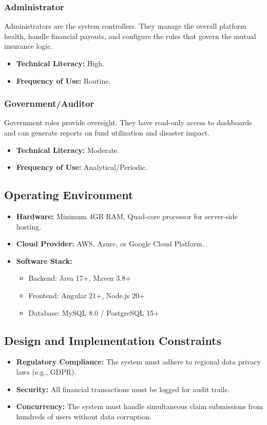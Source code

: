 \documentclass[12pt,a4paper]{article}
\begin{document}
\subsubsection{Administrator}
Administrators are the system controllers. They manage the overall platform health, handle financial payouts, and configure the rules that govern the mutual insurance logic.
\begin{itemize}
    \item \textbf{Technical Literacy:} High.
    \item \textbf{Frequency of Use:} Routine.
\end{itemize}

\subsubsection{Government/Auditor}
Government roles provide oversight. They have read-only access to dashboards and can generate reports on fund utilization and disaster impact.
\begin{itemize}
    \item \textbf{Technical Literacy:} Moderate.
    \item \textbf{Frequency of Use:} Analytical/Periodic.
\end{itemize}

\subsection{Operating Environment}
\begin{itemize}
    \item \textbf{Hardware:} Minimum 4GB RAM, Quad-core processor for server-side hosting.
    \item \textbf{Cloud Provider:} AWS, Azure, or Google Cloud Platform.
    \item \textbf{Software Stack:}
    \begin{itemize}
        \item Backend: Java 17+, Maven 3.8+
        \item Frontend: Angular 21+, Node.js 20+
        \item Database: MySQL 8.0 / PostgreSQL 15+
    \end{itemize}
\end{itemize}

\subsection{Design and Implementation Constraints}
\begin{itemize}
    \item \textbf{Regulatory Compliance:} The system must adhere to regional data privacy laws (e.g., GDPR).
    \item \textbf{Security:} All financial transactions must be logged for audit trails.
    \item \textbf{Concurrency:} The system must handle simultaneous claim submissions from hundreds of users without data corruption.
\end{itemize}
\end{document}
